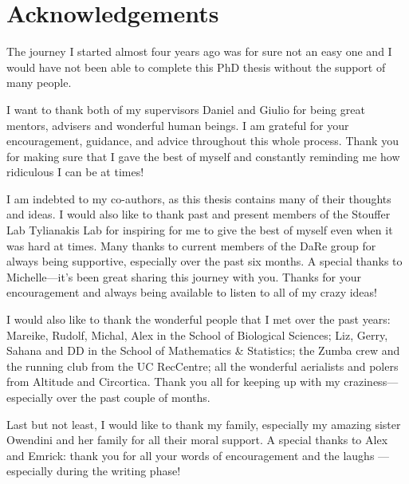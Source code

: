 



\bigskip


\begingroup

\let\clearpage\relax
\let\cleardoublepage\relax
\let\cleardoublepage\relax

\chapter*{Acknowledgements}
The journey I started almost four years ago was for sure not an easy one and I would have not been able to complete this PhD thesis without the support of many people.

I want to thank both of my supervisors Daniel and Giulio for being great mentors, advisers and wonderful human beings. I am grateful for your encouragement, guidance, and advice throughout this whole process. Thank you for making sure that I gave the best of myself and constantly reminding me how ridiculous I can be at times!

I am indebted to my co-authors, as this thesis contains many of their thoughts and ideas. I would also like to thank past and present members of the Stouffer Lab Tylianakis Lab for inspiring for me to give the best of myself even when it was hard at times. Many thanks to current members of the DaRe group for always being supportive, especially over the past six months. 
A special thanks to Michelle---it’s been great sharing this journey with you. Thanks for your encouragement and always being available to listen to all of my crazy ideas! 

I would also like to thank the wonderful people that I met over the past years: Mareike, Rudolf, Michal, Alex in the School of Biological Sciences; Liz, Gerry, Sahana and DD in the School of Mathematics \& Statistics; the Zumba crew and the running club from the UC RecCentre; all the wonderful aerialists and polers from Altitude and Circortica. Thank you all for keeping up with my craziness---especially over the past couple of months.

Last but not least, I would like to thank my family, especially my amazing sister Owendini and her family for all their moral support. A special thanks to Alex and Emrick: thank you for all your words of encouragement and the laughs --- especially during the writing phase!



\endgroup